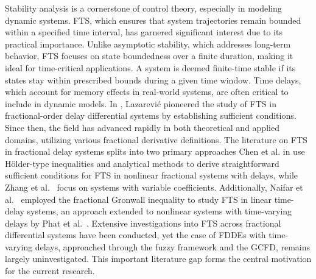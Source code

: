 \documentclass[reqno]{amsart}
\begin{document}
Stability analysis is a cornerstone of control theory, especially in modeling dynamic
systems. FTS, which ensures that system trajectories remain bounded within a specified
time interval, has garnered significant interest due to its practical importance.
Unlike asymptotic stability, which addresses long-term behavior, FTS focuses on state
boundedness over a finite duration, making it ideal for time-critical applications.
A system is deemed finite-time stable if its states stay within prescribed bounds
during a given time window. Time delays, which account for memory effects in
real-world systems, are often critical to include in dynamic models.
In \cite{laz2006}, Lazarević pioneered the study of FTS in fractional-order delay
differential systems by establishing sufficient conditions. Since then,
the field has advanced rapidly in both theoretical and applied domains, utilizing
various fractional derivative definitions. The literature on FTS in fractional delay
systems splits into two primary approaches Chen et al. in \cite{che} use H\"older-type
inequalities and analytical methods to derive straightforward sufficient conditions
for FTS in nonlinear fractional systems with delays, while Zhang et al.\ \cite{zhan}
focus on systems with variable coefficients. Additionally, Naifar et al.\
\cite{naif} employed the fractional Gronwall inequality to study FTS in linear
time-delay systems, an approach extended to nonlinear systems with time-varying delays
by Phat et al.\ \cite{phat}. Extensive investigations into FTS across fractional
differential systems have been conducted, yet the case of FDDEs
 with time-varying delays, approached through the fuzzy framework and the GCFD,
remains largely uninvestigated. This important literature gap forms the central
motivation for the current research.
\end{document}
